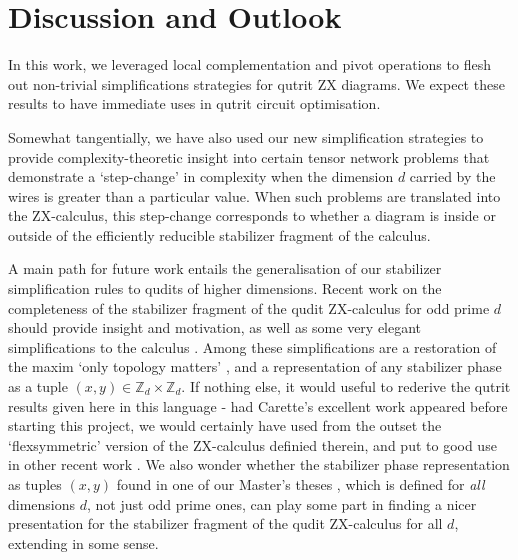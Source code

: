 \section{Discussion and Outlook}

In this work, we leveraged local complementation and pivot operations to flesh out non-trivial simplifications strategies for qutrit ZX diagrams. We expect these results to have immediate uses in qutrit circuit optimisation. 

Somewhat tangentially, we have also used our new simplification strategies to provide complexity-theoretic insight into certain tensor network problems that demonstrate a `step-change' in complexity when the dimension $d$ carried by the wires is greater than a particular value. When such problems are translated into the ZX-calculus, this step-change corresponds to whether a diagram is inside or outside of the efficiently reducible stabilizer fragment of the calculus.



A main path for future work entails the generalisation
of our stabilizer simplification rules to qudits of higher dimensions. Recent work on the completeness of the stabilizer fragment of the qudit ZX-calculus for odd prime $d$ should provide insight and motivation, as well as some very elegant simplifications to the calculus \cite{Booth_2022}. Among these simplifications are a restoration of the maxim `only topology matters' \cite{Carette_2021}, and a representation of any stabilizer phase as a tuple $(x, y) \in \mathbb{Z}_d \times \mathbb{Z}_d$. If nothing else, it would useful to rederive the qutrit results given here in this language - had Carette's excellent work \cite{Carette_2021} appeared before starting this project, we would certainly have used from the outset the `flexsymmetric' version of the ZX-calculus definied therein, and put to good use in other recent work \cite{van_de_Wetering_2022}. 
We also wonder whether the stabilizer phase representation as tuples $(x, y)$ found in one of our Master's theses \cite[Theorem 5.2]{TeagueMasters}, which is defined for \emph{all} dimensions $d$, not just odd prime ones, can play some part in finding a nicer presentation for the stabilizer fragment of the qudit ZX-calculus for all $d$, extending \cite{Booth_2022} in some sense.

